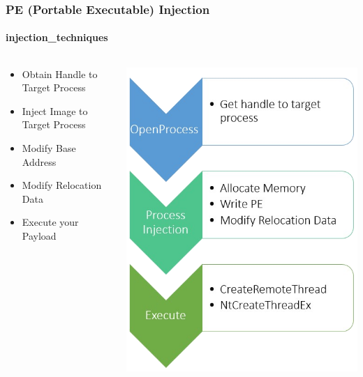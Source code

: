 \documentclass[aspectratio=169]{beamer}
\begin{document}
\begin{frame}
  \frametitle{PE (Portable Executable) Injection}
  \framesubtitle{injection\_techniques}
  \begin{columns}
    \begin{column}{.5\textwidth}
      \begin{itemize}
      \item{Obtain Handle to Target Process}
      \item{Inject Image to Target Process}
      \item{Modify Base Address}
      \item{Modify Relocation Data}
      \item{Execute your Payload}
      \end{itemize}
    \end{column}
    \hfill
    \begin{column}{.5\textwidth}
      \begin{center}
        \includegraphics[scale=0.4]{pe-injection}
      \end{center}
    \end{column}
  \end{columns}
\end{frame}
\end{document}
